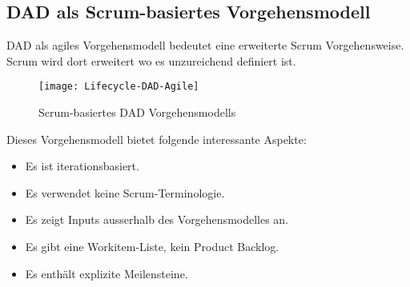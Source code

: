\subsection{DAD als Scrum-basiertes Vorgehensmodell}

DAD als agiles Vorgehensmodell bedeutet eine erweiterte Scrum Vorgehensweise. Scrum wird dort erweitert wo es unzureichend definiert ist.


\begin{figure}[H]
	\centering
	\texttt{[image: Lifecycle-DAD-Agile]}
	\caption{Scrum-basiertes DAD Vorgehensmodells}
	\label{fig:lifecycle}
\end{figure}\medskip


Dieses Vorgehensmodell bietet folgende interessante Aspekte:
\begin{itemize}
	\item Es ist iterationsbasiert.
	\item Es verwendet keine Scrum-Terminologie.
	\item Es zeigt Inputs ausserhalb des Vorgehensmodelles an.
	\item Es gibt eine Workitem-Liste, kein Product Backlog.
	\item Es enthält explizite Meilensteine.
\end{itemize}
